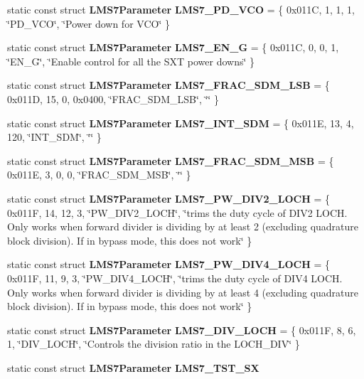 \begin{DoxyCompactItemize}
\item 
static const struct {\bf L\+M\+S7\+Parameter} {\bf L\+M\+S7\+\_\+\+P\+D\+\_\+\+V\+CO} = \{ 0x011\+C, 1, 1, 1, \char`\"{}\+P\+D\+\_\+\+V\+C\+O\char`\"{}, \char`\"{}\+Power down for V\+C\+O\char`\"{} \}
\item 
static const struct {\bf L\+M\+S7\+Parameter} {\bf L\+M\+S7\+\_\+\+E\+N\+\_\+G} = \{ 0x011\+C, 0, 0, 1, \char`\"{}\+E\+N\+\_\+\+G\char`\"{}, \char`\"{}\+Enable control for all the S\+X\+T power downs\char`\"{} \}
\item 
static const struct {\bf L\+M\+S7\+Parameter} {\bf L\+M\+S7\+\_\+\+F\+R\+A\+C\+\_\+\+S\+D\+M\+\_\+\+L\+SB} = \{ 0x011\+D, 15, 0, 0x0400, \char`\"{}\+F\+R\+A\+C\+\_\+\+S\+D\+M\+\_\+\+L\+S\+B\char`\"{}, \char`\"{}\char`\"{} \}
\item 
static const struct {\bf L\+M\+S7\+Parameter} {\bf L\+M\+S7\+\_\+\+I\+N\+T\+\_\+\+S\+DM} = \{ 0x011\+E, 13, 4, 120, \char`\"{}\+I\+N\+T\+\_\+\+S\+D\+M\char`\"{}, \char`\"{}\char`\"{} \}
\item 
static const struct {\bf L\+M\+S7\+Parameter} {\bf L\+M\+S7\+\_\+\+F\+R\+A\+C\+\_\+\+S\+D\+M\+\_\+\+M\+SB} = \{ 0x011\+E, 3, 0, 0, \char`\"{}\+F\+R\+A\+C\+\_\+\+S\+D\+M\+\_\+\+M\+S\+B\char`\"{}, \char`\"{}\char`\"{} \}
\item 
static const struct {\bf L\+M\+S7\+Parameter} {\bf L\+M\+S7\+\_\+\+P\+W\+\_\+\+D\+I\+V2\+\_\+\+L\+O\+CH} = \{ 0x011\+F, 14, 12, 3, \char`\"{}\+P\+W\+\_\+\+D\+I\+V2\+\_\+\+L\+O\+C\+H\char`\"{}, \char`\"{}trims the duty cycle of D\+I\+V2 L\+O\+C\+H. Only works when forward divider is dividing by at least 2 (excluding quadrature block division). If in bypass mode, this does not work\char`\"{} \}
\item 
static const struct {\bf L\+M\+S7\+Parameter} {\bf L\+M\+S7\+\_\+\+P\+W\+\_\+\+D\+I\+V4\+\_\+\+L\+O\+CH} = \{ 0x011\+F, 11, 9, 3, \char`\"{}\+P\+W\+\_\+\+D\+I\+V4\+\_\+\+L\+O\+C\+H\char`\"{}, \char`\"{}trims the duty cycle of D\+I\+V4 L\+O\+C\+H. Only works when forward divider is dividing by at least 4 (excluding quadrature block division). If in bypass mode, this does not work\char`\"{} \}
\item 
static const struct {\bf L\+M\+S7\+Parameter} {\bf L\+M\+S7\+\_\+\+D\+I\+V\+\_\+\+L\+O\+CH} = \{ 0x011\+F, 8, 6, 1, \char`\"{}\+D\+I\+V\+\_\+\+L\+O\+C\+H\char`\"{}, \char`\"{}\+Controls the division ratio in the L\+O\+C\+H\+\_\+\+D\+I\+V\char`\"{} \}
\item 
static const struct {\bf L\+M\+S7\+Parameter} {\bf L\+M\+S7\+\_\+\+T\+S\+T\+\_\+\+SX}
\item 

\end{DoxyCompactItemize}

